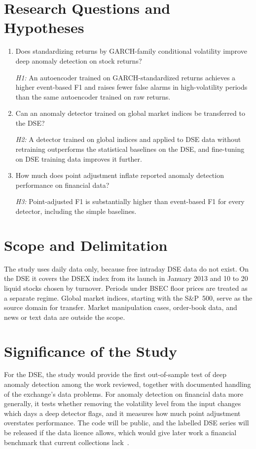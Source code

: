 \section{Research Questions and Hypotheses}
\begin{enumerate}
    \item[\textbf{RQ1.}] Does standardizing returns by GARCH-family conditional volatility
    improve deep anomaly detection on stock returns?

    \textit{H1:} An autoencoder trained on GARCH-standardized returns achieves a higher
    event-based F1 and raises fewer false alarms in high-volatility periods than the same
    autoencoder trained on raw returns.

    \item[\textbf{RQ2.}] Can an anomaly detector trained on global market indices be
    transferred to the DSE?

    \textit{H2:} A detector trained on global indices and applied to DSE data without
    retraining outperforms the statistical baselines on the DSE, and fine-tuning on DSE
    training data improves it further.

    \item[\textbf{RQ3.}] How much does point adjustment inflate reported anomaly detection
    performance on financial data?

    \textit{H3:} Point-adjusted F1 is substantially higher than event-based F1 for every
    detector, including the simple baselines.
\end{enumerate}

\section{Scope and Delimitation}
The study uses daily data only, because free intraday DSE data do not exist. On the DSE it
covers the DSEX index from its launch in January 2013 and 10 to 20 liquid stocks chosen by
turnover. Periods under BSEC floor prices are treated as a separate regime. Global market
indices, starting with the S\&P~500, serve as the source domain for transfer. Market
manipulation cases, order-book data, and news or text data are outside the scope.

\section{Significance of the Study}
For the DSE, the study would provide the first out-of-sample test of deep anomaly detection
among the work reviewed, together with documented handling of the exchange's data problems.
For anomaly detection on financial data more generally, it tests whether removing the
volatility level from the input changes which days a deep detector flags, and it measures
how much point adjustment overstates performance. The code will be public, and the labelled
DSE series will be released if the data licence allows, which would give later work a
financial benchmark that current collections lack~\cite{paparrizos2022tsb,schmidl2022anomaly}.

